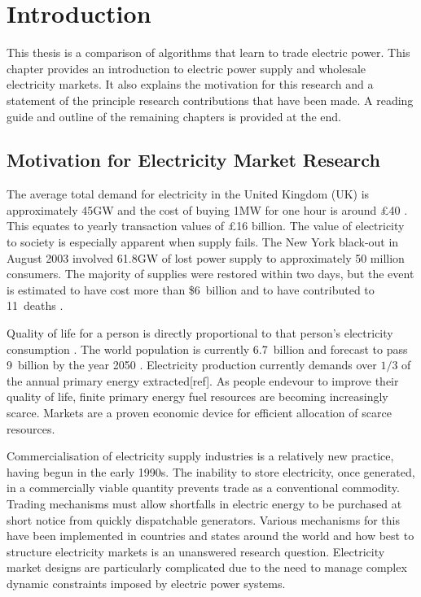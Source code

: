 \chapter{Introduction}
This thesis is a comparison of algorithms that learn to trade electric power.
This chapter provides an introduction to electric power supply and
wholesale electricity markets.  It also explains the motivation for this
research and a statement of the principle research contributions that
have been made.  A reading guide and outline of the remaining chapters is
provided at the end.

\section{Motivation for Electricity Market Research}
The average total demand for electricity in the United Kingdom (UK) is
approximately 45GW and the cost of buying 1MW for one hour is around \pounds40 \cite{decc:dukes09}.
This equates to yearly transaction values of \pounds16 billion.  The value of
electricity to society is especially apparent when supply fails.
The New York black-out in August 2003 involved 61.8GW of lost power supply to
approximately 50 million consumers. The majority of supplies were restored within two days, but the event is estimated to have cost more than \$6~billion and to have
contributed to 11~deaths \cite{minkel:2008,icf:2003}.

Quality of life for a person is directly proportional to that person's
electricity consumption \cite{alam:qol}.  The world population is currently
6.7~billion and forecast to pass 9~billion by the year 2050 \cite{un:pop}.
Electricity production currently demands over $1/3$ of the annual primary
energy extracted[ref]. As people endevour to improve their quality of life,
finite primary energy fuel resources are becoming increasingly scarce. Markets
are a proven economic device for efficient allocation of scarce resources.

Commercialisation of electricity supply industries is a relatively new
practice, having begun in the early 1990s.  The inability to store electricity,
once generated, in a commercially viable quantity prevents trade as a
conventional commodity.  Trading mechanisms must allow
shortfalls in electric energy to be purchased at short notice from quickly dispatchable
generators.  Various mechanisms for this have been implemented in countries and
states around the world and how best to structure electricity markets is an
unanswered research question.  Electricity market designs are particularly
complicated due to the need to manage complex dynamic constraints imposed by
electric power systems.

